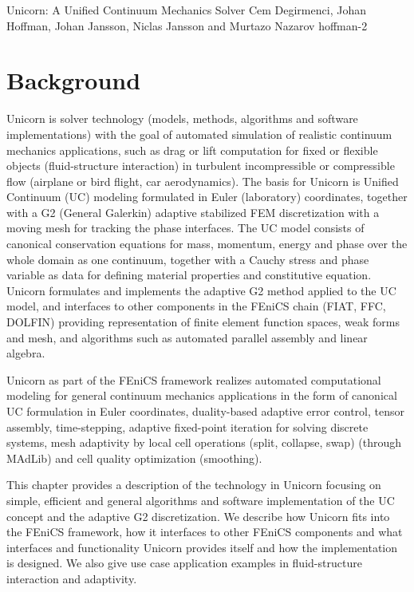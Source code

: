               {Unicorn: A Unified Continuum Mechanics Solver}
              {Cem Degirmenci, Johan Hoffman, Johan Jansson, Niclas Jansson and Murtazo Nazarov}
              {hoffman-2}

\section{Background}

Unicorn is solver technology (models, methods, algorithms and software
implementations) with the goal of automated simulation of realistic
continuum mechanics applications, such as drag or lift computation for
fixed or flexible objects (fluid-structure interaction) in turbulent
incompressible or compressible flow (airplane or bird flight, car
aerodynamics). The basis for Unicorn is Unified Continuum (UC)
modeling formulated in Euler (laboratory) coordinates, together with a
G2 (General Galerkin) adaptive stabilized FEM discretization with a
moving mesh for tracking the phase interfaces. The UC model consists
of canonical conservation equations for mass, momentum, energy and
phase over the whole domain as one continuum, together with a Cauchy
stress and phase variable as data for defining material properties and
constitutive equation. Unicorn formulates and implements the adaptive
G2 method applied to the UC model, and interfaces to other components
in the FEniCS chain (FIAT, FFC, DOLFIN) providing representation of
finite element function spaces, weak forms and mesh, and algorithms
such as automated parallel assembly and linear algebra.

Unicorn as part of the FEniCS framework realizes automated
computational modeling for general continuum mechanics applications in
the form of canonical UC formulation in Euler coordinates,
duality-based adaptive error control, tensor assembly, time-stepping,
adaptive fixed-point iteration for solving discrete systems, mesh
adaptivity by local cell operations (split, collapse, swap) (through
MAdLib) and cell quality optimization (smoothing).

This chapter provides a description of the technology in Unicorn
focusing on simple, efficient and general algorithms and software
implementation of the UC concept and the adaptive G2
discretization. We describe how Unicorn fits into the FEniCS
framework, how it interfaces to other FEniCS components and what
interfaces and functionality Unicorn provides itself and how the
implementation is designed. We also give use case application examples
in fluid-structure interaction and adaptivity.

